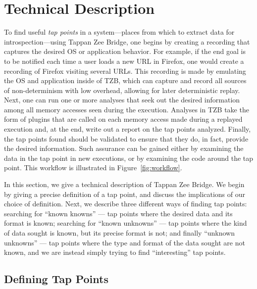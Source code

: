 \section{Technical Description}
\label{sec:technical}

To find useful \emph{tap points} in a system---places from which to
extract data for introspection---using Tappan Zee Bridge, one begins by
creating a recording that captures the desired OS or application
behavior. For example, if the end goal is to be notified each time a
user loads a new URL in Firefox, one would create a recording of Firefox
visiting several URLs. This recording is made by emulating the OS and
application inside of TZB, which can capture and record all sources of
non-determinism with low overhead, allowing for later deterministic
replay. Next, one can run one or more analyses that seek out the desired
information among all memory accesses seen during the execution.
Analyses in TZB take the form of plugins that are called on each memory
access made during a replayed execution and, at the end, write out a
report on the tap points analyzed. Finally, the tap points found should
be validated to ensure that they do, in fact, provide the desired
information. Such assurance can be gained either by examining the data
in the tap point in new executions, or by examining the code around the
tap point. This workflow is illustrated in Figure~\ref{fig:workflow}.

In this section, we give a technical description of Tappan Zee Bridge.
We begin by giving a precise definition of a tap point, and discuss the
implications of our choice of definition. Next, we describe three
different ways of finding tap points: searching for ``known knowns'' ---
tap points where the desired data and its format is known; searching for
``known unknowns'' --- tap points where the kind of data sought is known,
but its precise format is not; and finally ``unknown unknowns'' --- tap
points where the type and format of the data sought are not known, and
we are instead simply trying to find ``interesting'' tap points.

\subsection{Defining Tap Points}

